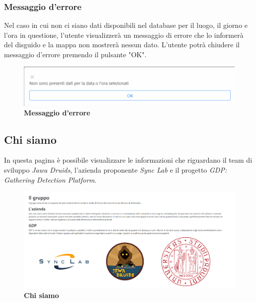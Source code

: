 \subsubsection{Messaggio d'errore} \label{UtilizzoDiGDPGatheringDetecionPlatformContenutoCentralePaginaInizialeHomeMessaggioDiErrore}
Nel caso in cui non ci siano dati disponibili nel database per il luogo, il giorno e l'ora in questione, l'utente visualizzerà un messaggio di errore che lo informerà del disguido e la mappa non mostrerà nessun dato. L'utente potrà chiudere il messaggio d'errore premendo il pulsante "OK". 
\begin{center}
	\begin{figure}[H]
		\centering\includegraphics[width=0.5\linewidth]{../immagini/manualeUtente/MessaggioErrore.png}
		\caption{\textbf{Messaggio d'errore}}
	\end{figure}
\end{center}

\subsection{Chi siamo} \label{UtilizzoDiGDPGatheringDetecionPlatformContenutoCentraleChiSiamo}
In questa pagina è possibile visualizzare le informazioni che riguardano il team di sviluppo \textit{Jawa Druids}, l'azienda proponente \textit{Sync Lab} e il progetto \textit{GDP: Gathering Detection Platform}. 

\begin{center}
	\begin{figure}[H]
		\centering\includegraphics[width=0.5\linewidth]{../immagini/manualeUtente/AboutUs.png}
		\caption{\textbf{Chi siamo}}
	\end{figure}
\end{center} 

